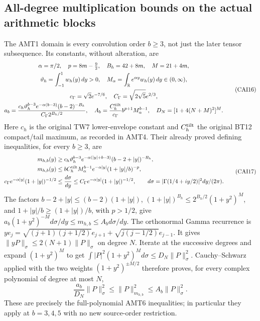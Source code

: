 \subsection{All-degree multiplication bounds on the actual arithmetic blocks}

The AMT1 domain is every convolution order $b\ge3$, not just the later
tensor subsequence. Its constants, without alteration, are
\[
\begin{gathered}
 \alpha=\pi/2,\quad p=8m-\tfrac92,\quad B_h=42+8m,\quad M=21+4m,\\
 \vartheta_h=\int_{-1}^1w_h(y)\,dy>0,\quad
 M_\alpha=\int_{\mathbb R}e^{\alpha y}w_h(y)\,dy\in(0,\infty),\\
 c_\Gamma=\sqrt2e^{-7/6},\quad C_\Gamma=\sqrt{2\sqrt5}e^{2/3},\\
 a_b=\frac{c_h\vartheta_h^{b-3}e^{-\alpha(b-3)}(b-2)^{-B_h}}
                   {C_\Gamma2^{B_h/2}},\quad
 A_b=\frac{C_h^{\rm tilt}}{c_\Gamma}b^{p+1}M_\alpha^{b-1},\quad
 D_N=[1+4(N+M)^2]^M.
\end{gathered}\tag{CAI16}
\]
Here $c_h$ is the original TW7 lower-envelope constant and
$C_h^{\rm tilt}$ the original BT12 compact/tail maximum, as recorded
in AMT4. Their already proved defining inequalities, for every $b\ge3$,
are
\[
\begin{aligned}
 m_{h,b}(y)&\ge c_h\vartheta_h^{b-3}
             e^{-\alpha(|y|+b-3)}(b-2+|y|)^{-B_h},\\
 m_{h,b}(y)&\le bC_h^{\rm tilt}M_\alpha^{b-1}
             e^{-\alpha|y|}(1+|y|/b)^{-p},\\
 c_\Gamma e^{-\alpha|y|}(1+|y|)^{-1/2}
 &\le \frac{d\sigma}{dy}\le
 C_\Gamma e^{-\alpha|y|}(1+|y|)^{-1/2},\qquad
 d\sigma=|\Gamma(1/4+iy/2)|^2dy/(2\pi).
\end{aligned}\tag{CAI17}
\]
The factors $b-2+|y|\le(b-2)(1+|y|)$,
$(1+|y|)^{B_h}\le2^{B_h/2}(1+y^2)^M$, and
$1+|y|/b\ge(1+|y|)/b$, with $p>1/2$, give
$a_b(1+y^2)^{-M}d\sigma/dy\le m_{h,b}\le A_b d\sigma/dy$.
The orthonormal Gamma recurrence is
$ye_j=\sqrt{(j+1)(j+1/2)}e_{j+1}+\sqrt{j(j-1/2)}e_{j-1}$.
It gives $\|yP\|_\sigma\le2(N+1)\|P\|_\sigma$ on degree $N$.
Iterate at the successive degrees and expand $(1+y^2)^M$ to get
$\int|P|^2(1+y^2)^M d\sigma\le D_N\|P\|_\sigma^2$.
Cauchy--Schwarz applied with the two weights $(1+y^2)^{\pm M/2}$
therefore proves, for every complex polynomial of degree at most $N$,
\[
 \frac{a_b}{D_N}\|P\|_\sigma^2\le\|P\|_{m_{h,b}}^2
                         \le A_b\|P\|_\sigma^2.\tag{CAI18}
\]
These are precisely the full-polynomial AMT6 inequalities; in particular
they apply at $b=3,4,5$ with no new source-order restriction.

